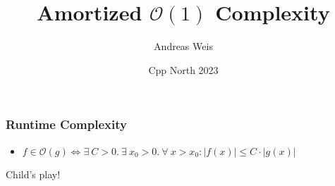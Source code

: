 \documentclass[aspectratio=169]{beamer}
\title{Amortized $\mathcal{O}(1)$ Complexity}
\author{Andreas Weis}
\institute{Woven by Toyota}
\date{Cpp North 2023}
\begin{document}

\iftrue %

\begin{frame}
  \frametitle{Runtime Complexity}
  
  \begin{center}
  \begin{itemize}
    \item $f \in \mathcal{O}(g) \iff \exists\ C > 0.\ \exists\ x_0 > 0.\ \forall\ x > x_0: |f(x)| \le C\cdot|g(x)|$
  \end{itemize}
  \end{center}

\end{frame}

\begin{frame}

  \begin{center}
  \huge{Child's play!}
  \end{center}
  
\end{frame}
\end{document}

